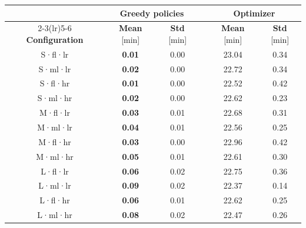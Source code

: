 \begin{tabular}{@{}c cc c cc@{}}
\toprule
& \multicolumn{2}{c}{\textbf{Greedy policies}} & & \multicolumn{2}{c}{\textbf{Optimizer}} \\
\cmidrule(lr){2-3}\cmidrule(lr){5-6}
\textbf{Configuration} & \textbf{Mean} [\unit{\minute}] & \textbf{Std} [\unit{\minute}] & & \textbf{Mean} [\unit{\minute}] & \textbf{Std} [\unit{\minute}] \\
\midrule
S·fl·lr & \textbf{0.01} & 0.00 & & 23.04 & 0.34 \\
S·ml·lr & \textbf{0.02} & 0.00 & & 22.72 & 0.34 \\
S·fl·hr & \textbf{0.01} & 0.00 & & 22.52 & 0.42 \\
S·ml·hr & \textbf{0.02} & 0.00 & & 22.62 & 0.23 \\
\addlinespace
M·fl·lr & \textbf{0.03} & 0.01 & & 22.68 & 0.31 \\
M·ml·lr & \textbf{0.04} & 0.01 & & 22.56 & 0.25 \\
M·fl·hr & \textbf{0.03} & 0.00 & & 22.96 & 0.42 \\
M·ml·hr & \textbf{0.05} & 0.01 & & 22.61 & 0.30 \\
\addlinespace
L·fl·lr & \textbf{0.06} & 0.02 & & 22.75 & 0.36 \\
L·ml·lr & \textbf{0.09} & 0.02 & & 22.37 & 0.14 \\
L·fl·hr & \textbf{0.06} & 0.01 & & 22.62 & 0.25 \\
L·ml·hr & \textbf{0.08} & 0.02 & & 22.47 & 0.26 \\
\bottomrule
\end{tabular}